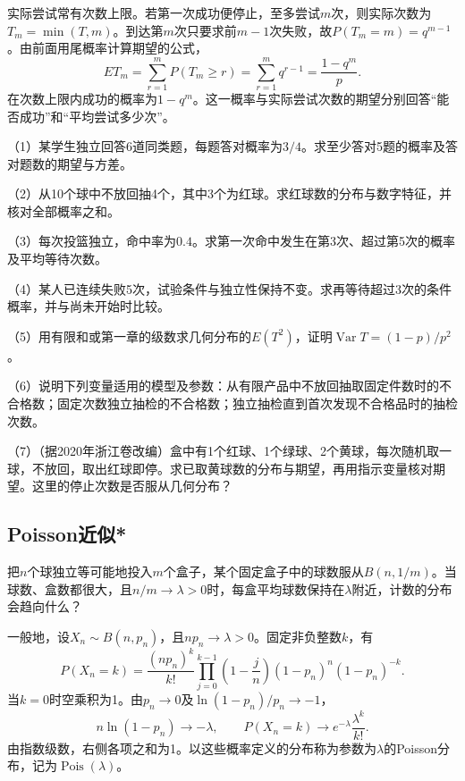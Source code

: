 实际尝试常有次数上限。若第一次成功便停止，至多尝试\(m\)次，则实际次数为\(T_m=\min(T,m)\)。到达第\(m\)次只要求前\(m-1\)次失败，故\(P(T_m=m)=q^{m-1}\)。由前面用尾概率计算期望的公式，
\[
 E T_m=\sum_{r=1}^mP(T_m\ge r)
 =\sum_{r=1}^m q^{r-1}=\frac{1-q^m}{p}.
\]
在次数上限内成功的概率为\(1-q^m\)。这一概率与实际尝试次数的期望分别回答“能否成功”和“平均尝试多少次”。

\begin{exercise}
\mbox{}\par\nobreak

（1）某学生独立回答6道同类题，每题答对概率为\(3/4\)。求至少答对5题的概率及答对题数的期望与方差。

（2）从10个球中不放回抽4个，其中3个为红球。求红球数的分布与数字特征，并核对全部概率之和。

（3）每次投篮独立，命中率为\(0.4\)。求第一次命中发生在第3次、超过第5次的概率及平均等待次数。

（4）某人已连续失败5次，试验条件与独立性保持不变。求再等待超过3次的条件概率，并与尚未开始时比较。

（5）用有限和或第一章的级数求几何分布的\(E(T^2)\)，证明\(\operatorname{Var}T=(1-p)/p^2\)。

（6）说明下列变量适用的模型及参数：从有限产品中不放回抽取固定件数时的不合格数；固定次数独立抽检的不合格数；独立抽检直到首次发现不合格品时的抽检次数。

（7）（据2020年浙江卷改编）盒中有1个红球、1个绿球、2个黄球，每次随机取一球，不放回，取出红球即停。求已取黄球数的分布与期望，再用指示变量核对期望。这里的停止次数是否服从几何分布？
\end{exercise}

\FloatBarrier
\newpage
\subsection{Poisson近似*}

把\(n\)个球独立等可能地投入\(m\)个盒子，某个固定盒子中的球数服从\(B(n,1/m)\)。当球数、盒数都很大，且\(n/m\to\lambda>0\)时，每盒平均球数保持在\(\lambda\)附近，计数的分布会趋向什么？

一般地，设\(X_n\sim B(n,p_n)\)，且\(np_n\to\lambda>0\)。固定非负整数\(k\)，有
\[
 P(X_n=k)=\frac{(np_n)^k}{k!}
 \prod_{j=0}^{k-1}\left(1-\frac jn\right)
 (1-p_n)^n(1-p_n)^{-k}.
\]
当\(k=0\)时空乘积为1。由\(p_n\to0\)及\(\ln(1-p_n)/p_n\to-1\)，
\[
 n\ln(1-p_n)\to-\lambda,\qquad
 P(X_n=k)\longrightarrow e^{-\lambda}\frac{\lambda^k}{k!}.
\]
由指数级数，右侧各项之和为1。以这些概率定义的分布称为参数为\(\lambda\)的{\heiti Poisson分布}，记为\(\operatorname{Pois}(\lambda)\)。

